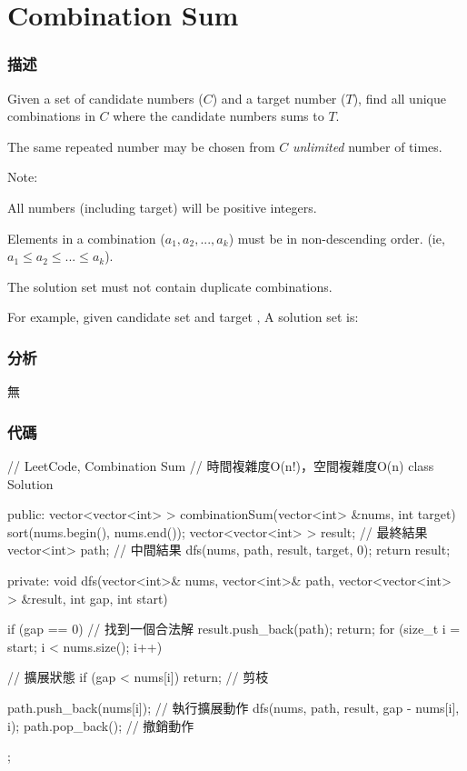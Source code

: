 \section{Combination Sum} %
\label{sec:combination-sum}


\subsubsection{描述}
Given a set of candidate numbers ($C$) and a target number ($T$), find all unique combinations in $C$ where the candidate numbers sums to $T$.

The same repeated number may be chosen from $C$ \emph{unlimited} number of times.

Note:
\begindot
\item All numbers (including target) will be positive integers.
\item Elements in a combination ($a_1, a_2, ..., a_k$) must be in non-descending order. (ie, $a_1 \leq a_2 \leq ... \leq a_k$).
\item The solution set must not contain duplicate combinations.
\myenddot

For example, given candidate set  and target , 
A solution set is: 
\begin{Code}
[7] 
[2, 2, 3] 
\end{Code}


\subsubsection{分析}
無


\subsubsection{代碼}
\begin{Code}
// LeetCode, Combination Sum
// 時間複雜度O(n!)，空間複雜度O(n)
class Solution {
public:
    vector<vector<int> > combinationSum(vector<int> &nums, int target) {
        sort(nums.begin(), nums.end());
        vector<vector<int> > result; // 最終結果
        vector<int> path; // 中間結果
        dfs(nums, path, result, target, 0);
        return result;
    }

private:
    void dfs(vector<int>& nums, vector<int>& path, vector<vector<int> > &result,
            int gap, int start) {
        if (gap == 0) {  // 找到一個合法解
            result.push_back(path);
            return;
        }
        for (size_t i = start; i < nums.size(); i++) { // 擴展狀態
            if (gap < nums[i]) return; // 剪枝

            path.push_back(nums[i]); // 執行擴展動作
            dfs(nums, path, result, gap - nums[i], i);
            path.pop_back();  // 撤銷動作
        }
    }
};
\end{Code}



